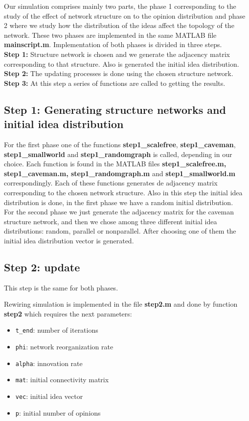 Our simulation comprises mainly two parts, the phase 1 corresponding to the study  of the effect of network structure on to the opinion distribution and phase 2 where we study how the distribution of the ideas affect the topology of the network. These two phases are implemented in the same MATLAB file \textbf{mainscript.m}. Implementation of both phases is divided in three steps. 
\\

\noindent \textbf{Step 1:} Structure network is chosen and we generate the adjacency matrix corresponding to that structure. Also is generated the initial idea distribution.\\
\textbf{Step 2:} The updating processes is done using the chosen structure network.\\
\textbf{Step 3:} At this step a series of functions are called to getting the results.

\subsection{Step 1: Generating structure networks and initial idea distribution}

For the first phase one of the functions \textbf{step1\_scalefree}, \textbf{step1\_caveman},\\ \textbf{step1\_smallworld} and \textbf{step1\_randomgraph} is called, depending in our choice. Each function is found in the MATLAB files \textbf{step1\_scalefree.m, step1\_caveman.m, step1\_randomgraph.m} and \textbf{step1\_smallworld.m} correspondingly.  Each of these functions generates de adjacency matrix corresponding to the chosen network structure. Also in this step the initial idea distribution is done, in the first phase we have a random initial distribution. 
\\
For the second phase we just generate the adjacency matrix for the caveman structure network, and then we chose among three different initial idea distributions: random, parallel or nonparallel. After choosing one of them the initial idea distribution vector is generated.


\subsection{Step 2: update}

This step is the same for both phases.

Rewiring simulation is implemented in the file \textbf{step2.m} and done by function \textbf{step2} which requires the next parameters:
\begin{itemize}

\item \verb+t_end+: number of iterations
 \item \verb+phi+:  network reorganization rate
 \item \verb+alpha+: innovation rate
\item \verb+mat+: initial connectivity matrix
\item  \verb+vec+: initial idea vector
\item \verb+p+: initial number of opinions
 \end{itemize}
 
